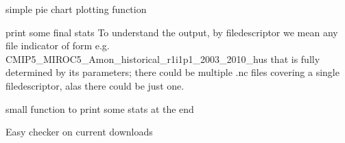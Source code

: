 \documentclass[letterpaper,10pt,english]{sphinxmanual}
\begin{document}

\begin{fulllineitems}
\label{\detokenize{index:cmip5datafinder.plotter}}
simple pie chart plotting function

\end{fulllineitems}


\begin{fulllineitems}
\label{\detokenize{index:cmip5datafinder.print_final_stats}}
print some final stats
To understand the output, by filedescriptor we mean any file indicator
of form e.g. CMIP5\_MIROC5\_Amon\_historical\_r1i1p1\_2003\_2010\_hus that is fully
determined by its parameters; there could be multiple .nc files
covering a single filedescriptor, alas there could be just one.

\end{fulllineitems}


\begin{fulllineitems}
\label{\detokenize{index:cmip5datafinder.print_stats}}
small function to print some stats at the end

\end{fulllineitems}


\begin{fulllineitems}
\label{\detokenize{index:cmip5datafinder.synda_check_dll}}
Easy checker on current downloads

\end{fulllineitems}

\end{document}
